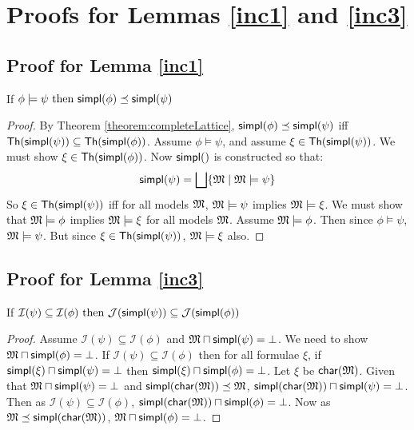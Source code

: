 \section{Proofs for Lemmas \ref{inc1} and \ref{inc3}}\label{app:completeness:proofs}
\label{inc-appendix}
\subsection{Proof for Lemma \ref{inc1}}
If $\phi \models \psi \mbox{ then } \mathsf{simpl}(\phi) \preceq \mathsf{simpl}(\psi)$

\begin{proof}
By Theorem \ref{theorem:completeLattice}, $ \mathsf{simpl}(\phi) \preceq \mathsf{simpl}(\psi)$ iff $\mathsf{Th}(\mathsf{simpl}(\psi)) \subseteq  \mathsf{Th}(\mathsf{simpl}(\phi))$.
Assume $\phi \models \psi$, and assume $\xi \in \mathsf{Th}(\mathsf{simpl}(\psi)) $. We must show $\xi \in \mathsf{Th}(\mathsf{simpl}(\phi)) $.
Now $\SIMPL$ is constructed so that:
\[
\mathsf{simpl}(\psi) = \bigsqcup \{ \frak{M} \; | \; \frak{M} \models \psi \}
\]
So  $\xi \in \mathsf{Th}(\mathsf{simpl}(\psi)) $ iff for all models $\frak{M}$, $\frak{M} \models \psi$ implies $\frak{M} \models \xi$.
We must show that $\frak{M} \models \phi$ implies $\frak{M} \models \xi$ for all models $\frak{M}$.
Assume $\frak{M} \models \phi$. Then since $\phi \models \psi$,  $\frak{M} \models \psi$. 
But since $\xi \in \mathsf{Th}(\mathsf{simpl}(\psi)) $, $\frak{M} \models \xi$ also.

\end{proof}

\subsection{Proof for Lemma \ref{inc3}}
If $\mathcal{I}(\psi) \subseteq \mathcal{I}(\phi) \mbox{ then } \mathcal{J}(\mathsf{simpl}(\psi)) \subseteq \mathcal{J}(\mathsf{simpl}(\phi))$
\begin{proof}
Assume $\mathcal{I}(\psi) \subseteq \mathcal{I}(\phi)$ and $\frak{M} \sqcap \mathsf{simpl}(\psi) = \bot$.
We need to show $\frak{M} \sqcap \mathsf{simpl}(\phi) = \bot$.
If $\mathcal{I}(\psi) \subseteq \mathcal{I}(\phi)$ then for all formulae $\xi$, if $\mathsf{simpl}(\xi) \sqcap \mathsf{simpl}(\psi) = \bot$ then $\mathsf{simpl}(\xi) \sqcap \mathsf{simpl}(\phi) = \bot$.
Let $\xi$ be $\mathsf{char}(\frak{M})$.
Given that $\frak{M} \sqcap \mathsf{simpl}(\psi) = \bot$ and $\mathsf{simpl}(\mathsf{char}(\frak{M})) \preceq \frak{M}$, $\mathsf{simpl}(\mathsf{char}(\frak{M})) \sqcap \mathsf{simpl}(\psi) = \bot$.
Then as $\mathcal{I}(\psi) \subseteq \mathcal{I}(\phi)$, $\mathsf{simpl}(\mathsf{char}(\frak{M})) \sqcap \mathsf{simpl}(\phi) = \bot$.
Now as $\frak{M}  \preceq \mathsf{simpl}(\mathsf{char}(\frak{M}))$, $\frak{M} \sqcap \mathsf{simpl}(\phi) = \bot$.

\end{proof}
